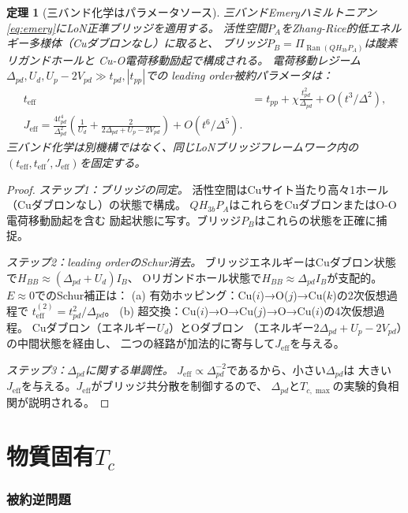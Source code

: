 \documentclass[12pt]{article}
\theoremstyle{plain}
\newtheorem{theorem}{定理}[section]
\theoremstyle{definition}
\numberwithin{equation}{section}
\newcommand{\eff}{\mathrm{eff}}
\DeclareMathOperator{\Ran}{Ran}
\begin{document}
\begin{theorem}[三バンド化学はパラメータソース]\label{thm:threeband}
三バンドEmeryハミルトニアン\eqref{eq:emery}にLoN正準ブリッジを適用する。
活性空間$P_A$をZhang-Rice的低エネルギー多様体（Cuダブロンなし）に取ると、
ブリッジ$P_B=\Pi_{\Ran(QH_{3b}P_A)}$は酸素リガンドホールと
Cu-O電荷移動励起で構成される。
電荷移動レジーム$\Delta_{pd},U_d,U_p-2V_{pd}\gg t_{pd},|t_{pp}|$での
leading order被約パラメータは：
\begin{align}
t_{\eff} &= t_{pp}+\chi\frac{t_{pd}^2}{\Delta_{pd}}+O(t^3/\Delta^2),\\
\boxed{J_{\eff} = \frac{4t_{pd}^4}{\Delta_{pd}^2}
\left(\frac{1}{U_d}+\frac{2}{2\Delta_{pd}+U_p-2V_{pd}}\right)
+O(t^6/\Delta^5).}
\end{align}
三バンド化学は別機構ではなく、同じLoNブリッジフレームワーク内の
$(t_{\eff},t_{\eff}',J_{\eff})$を固定する。
\end{theorem}

\begin{proof}
\emph{ステップ1：ブリッジの同定。}
活性空間はCuサイト当たり高々1ホール（Cuダブロンなし）の状態で構成。
$QH_{3b}P_A$はこれらをCuダブロンまたはO-O電荷移動励起を含む
励起状態に写す。ブリッジ$P_B$はこれらの状態を正確に捕捉。

\emph{ステップ2：leading orderのSchur消去。}
ブリッジエネルギーはCuダブロン状態で$H_{BB}\approx(\Delta_{pd}+U_d)I_B$、
Oリガンドホール状態で$H_{BB}\approx\Delta_{pd}I_B$が支配的。
$E\approx 0$でのSchur補正は：
(a) 有効ホッピング：Cu($i$)→O($j$)→Cu($k$)の2次仮想過程で
$t_{\eff}^{(2)}=t_{pd}^2/\Delta_{pd}$。
(b) 超交換：Cu($i$)→O→Cu($j$)→O→Cu($i$)の4次仮想過程。
Cuダブロン（エネルギー$U_d$）とOダブロン
（エネルギー$2\Delta_{pd}+U_p-2V_{pd}$）の中間状態を経由し、
二つの経路が加法的に寄与して$J_{\eff}$を与える。

\emph{ステップ3：$\Delta_{pd}$に関する単調性。}
$J_{\eff}\propto\Delta_{pd}^{-2}$であるから、小さい$\Delta_{pd}$は
大きい$J_{\eff}$を与える。$J_{\eff}$がブリッジ共分散を制御するので、
$\Delta_{pd}$と$T_{c,\max}$の実験的負相関が説明される。
\end{proof}


\part{物質固有$T_c$}

\section{被約逆問題}\label{sec:materialTc}
\end{document}
